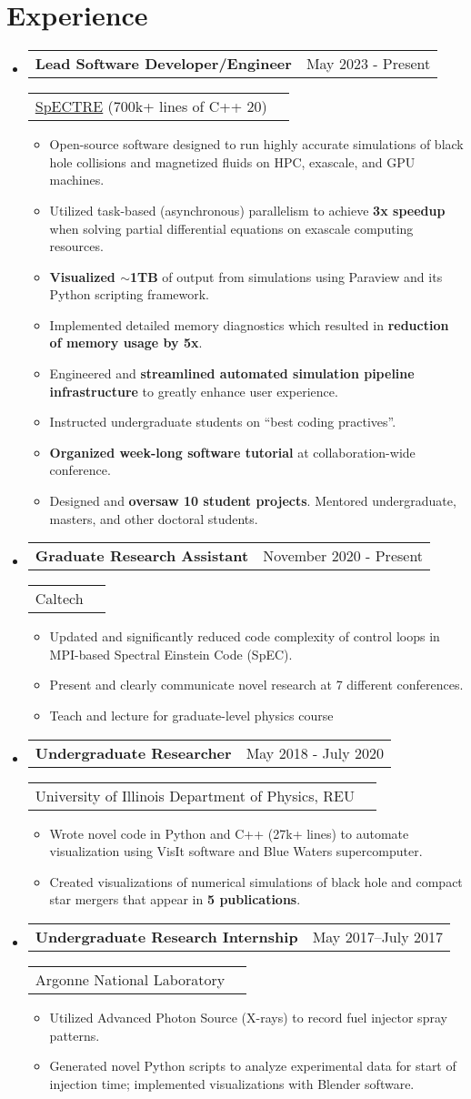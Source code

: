 \documentclass[a4paper,20pt]{article}
\makeatletter
\newcommand{\resumeItem}[1]{
  \item\small{
    #1 \vspace{-2pt}
  }
}
\newcommand{\resumeSubheading}[4]{
  \vspace{-1pt}\item
    \begin{tabular*}{0.97\textwidth}{l@{\extracolsep{\fill}}r}
      \textbf{#1} & #2 \\
    \end{tabular*}
    \begin{tabular*}{0.97\textwidth}{l@{\extracolsep{\fill}}r}
    #3 & \textit{#4} \\
    \end{tabular*}
    \vspace{-5pt}
}
\newcommand{\resumeSubHeadingListStart}{\begin{itemize}[leftmargin=*]}
\newcommand{\resumeSubHeadingListEnd}{\end{itemize}}
\newcommand{\resumeItemListStart}{\begin{itemize}}
\newcommand{\resumeItemListEnd}{\end{itemize}\vspace{-5pt}}
\makeatother
\begin{document}
\section{Experience}
  \resumeSubHeadingListStart
  \resumeSubheading{Lead Software Developer/Engineer}{May 2023 -
  Present}{\href{https://github.com/sxs-collaboration/spectre}{SpECTRE} (700k+
  lines of C++ 20)}{}
    \resumeItemListStart
  \resumeItem{Open-source software designed to run highly accurate simulations
  of black hole collisions and magnetized fluids on HPC, exascale, and GPU machines.}
  \resumeItem{Utilized task-based (asynchronous) parallelism to
  achieve \textbf{3x speedup} when solving partial differential equations on exascale
  computing resources.}
  \resumeItem{\textbf{Visualized $\sim$1TB} of output from simulations using Paraview and its
  Python scripting framework.}
  \resumeItem{Implemented detailed memory diagnostics which resulted in
  \textbf{reduction of memory usage by 5x}.}
  \resumeItem{Engineered and \textbf{streamlined automated simulation pipeline
  infrastructure} to greatly enhance user experience.}
  \resumeItem{Instructed undergraduate students on ``best coding practives''.}
  \resumeItem{\textbf{Organized week-long software tutorial} at
  collaboration-wide conference.}
  \resumeItem{Designed and \textbf{oversaw 10 student projects}. Mentored
  undergraduate, masters, and other doctoral students.}
    \resumeItemListEnd

  \resumeSubheading{Graduate Research Assistant}{November 2020 -
  Present}{Caltech}{}
    \resumeItemListStart
  \resumeItem{Updated and significantly reduced code complexity of control loops in
  MPI-based Spectral Einstein Code (SpEC).} 
  \resumeItem{Present and clearly communicate novel research at 7 different
  conferences.}
  \resumeItem{Teach and lecture for graduate-level physics course}
      \resumeItemListEnd

    \resumeSubheading{Undergraduate Researcher}{May 2018 - July 2020}{University of Illinois Department of Physics, REU}{}
    \resumeItemListStart
  \resumeItem{Wrote novel code in Python and C++ (27k+ lines) to automate visualization using
  VisIt software and Blue Waters supercomputer.}
  \resumeItem{Created visualizations of numerical simulations of black hole and
  compact star mergers that appear in \textbf{5 publications}.}
      \resumeItemListEnd

    \resumeSubheading
		{Undergraduate Research Internship}{May 2017–July 2017}
		{Argonne National Laboratory}{}
		\resumeItemListStart
        \resumeItem{Utilized Advanced Photon Source (X-rays) to record fuel injector spray patterns.}
        \resumeItem{Generated novel Python scripts to analyze experimental data for start of injection time; implemented visualizations with Blender software.}
		\resumeItemListEnd
\resumeSubHeadingListEnd
\end{document}

